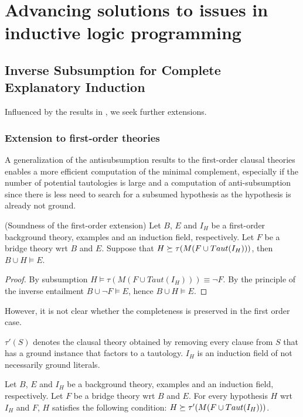 \chapter{Advancing solutions to issues in inductive logic programming}

\section{Inverse Subsumption for Complete Explanatory Induction}\cite{yamamoto2012inverse}
Influenced by the results in \cite{yamamoto2012inverse}, we seek further extensions.

\subsection{Extension to first-order theories}
A generalization of the antisubsumption results to the first-order clausal theories enables a more efficient computation of the minimal complement, especially if the number of potential tautologies is large and a computation of anti-subsumption since there is less need to search for a subsumed hypothesis as the hypothesis is already not ground.

\begin{proposition}(Soundness of the first-order extension)
Let $B$, $E$ and $I_H$ be a first-order background theory, examples and an induction field, respectively. Let $F$ be a bridge theory wrt $B$ and $E$. Suppose that $H \succeq \tau(M(F \cup Taut(I_H)))$, then $B \cup H \models E$.
\end{proposition}
\begin{proof}
By subsumption $H \models \tau(M(F \cup Taut(I_H))) \equiv \neg F$. By the principle of the inverse entailment $B \cup \neg F \models E$, hence
$B \cup H \models E$.
\end{proof}

However, it is not clear whether the completeness is preserved in the first order case.

$\tau'(S)$ denotes the clausal theory obtained by removing every clause from $S$ that has a ground instance that factors to a tautology. $I_H$ is an induction field of not necessarily ground literals.

\begin{conjecture}\label{subsumptionConjectureFirstOrder}
Let $B$, $E$ and $I_H$ be a background theory, examples and an induction field, respectively. Let $F$ be a bridge theory wrt $B$ and $E$. For every hypothesis $H$ wrt $I_H$ and $F$, $H$ satisfies the following condition:
$H \succeq \tau'(M(F \cup Taut(I_H)))$.
\end{conjecture}

